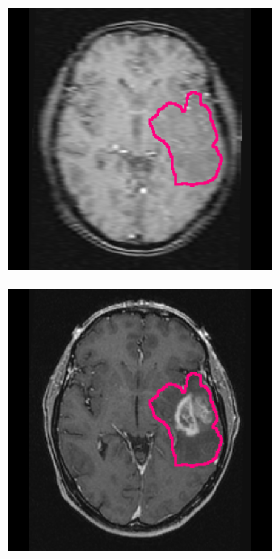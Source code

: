 \begin{subappendices}
\begin{figure}[htbp]
\begin{subfigure}[b]{0.95\textwidth}
\begin{subfigure}[b]{0.215\textwidth}
        \includegraphics[width=\textwidth, clip, trim=2.5cm 0.5cm 2.5cm 0.5cm]{Figures/Random_segs/T1_TCGA-08-0353.png}
        \end{subfigure}
        \hfill
        \begin{subfigure}[b]{0.215\textwidth}
        \includegraphics[width=\textwidth, clip, trim=2.5cm 0.5cm 2.5cm 0.5cm]{Figures/Random_segs/T1GD_TCGA-08-0353.png}

\end{subfigure}
\end{subfigure}
\end{figure}
\end{subappendices}
